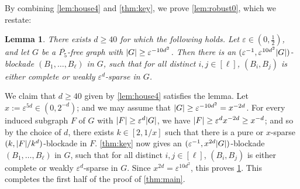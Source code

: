 \documentclass[11pt,reqno,a4paper]{amsart}
\newtheorem{lemma}[theorem]{Lemma}
\let\oldendproof\endproof
\renewenvironment{proof}[1][\proofname]{%
	\oldproof[\normalfont\bfseries #1]%
}{\oldendproof}
\newcommand{\eps}{\varepsilon}
\DeclarePairedDelimiter\abs{\lvert}{\rvert}%
\begin{document}
	By combining \cref{lem:house4} and \cref{thm:key}, we prove \cref{lem:robust0}, which we restate:
	\begin{lemma}
		\label{lem:epsone}
		There exists $d\ge40$ for which the following holds.
		Let $\eps\in(0,\frac12)$, and let $G$ be a $\overline{P_5}$-free graph with $\abs G\ge \eps^{-10d^2}$.
		Then there is an $(\eps^{-1},{\eps^{10d^2}\abs G})$-blockade $(B_1,\ldots,B_{\ell})$ in $G$, such that for all distinct $i,j\in[\ell]$, $(B_i,B_j)$ is either complete or weakly $\eps^d$-sparse in $G$.
	\end{lemma}
	\begin{proof}
		We claim that $d\ge40$ given by \cref{lem:house4} satisfies the lemma.
		Let $x:=\eps^{5d}\in(0,2^{-d})$; and we may assume that $\abs G\ge \eps^{-10d^2}=x^{-2d}$.
		For every induced subgraph $F$ of $G$ with $\abs F\ge \eps^d\abs G$, we have
		$\abs F\ge \eps^dx^{-2d}\ge x^{-d}$;
		and so by the choice of $d$, there exists $k\in[2,1/x]$ such that there is a pure or $x$-sparse $(k,\abs F/k^d)$-blockade in $F$.
		\cref{thm:key} now gives an $(\eps^{-1},{x^{2d}\abs G})$-blockade $(B_1,\ldots,B_{\ell})$ in $G$, such that for all distinct $i,j\in[\ell]$, $(B_i,B_j)$ is either complete or weakly $\eps^d$-sparse in $G$.
		Since $x^{2d}=\eps^{10d^2}$, this proves \cref{lem:epsone}.
	\end{proof}
	This completes the first half of the proof of \cref{thm:main}.
\end{document}

